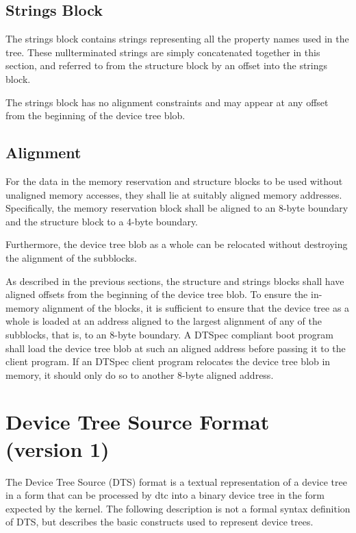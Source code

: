 \documentclass[a4paper,10pt,oneside]{sphinxmanual}
\begin{document}
\section{Strings Block}
\label{flattened-format:strings-block}\label{flattened-format:sect-fdt-strings-block}
The strings block contains strings representing all the property names
used in the tree. These nullterminated strings are simply concatenated
together in this section, and referred to from the structure block by an
offset into the strings block.

The strings block has no alignment constraints and may appear at any
offset from the beginning of the device tree blob.


\section{Alignment}
\label{flattened-format:alignment}\label{flattened-format:sect-fdt-alignment}
For the data in the memory reservation and structure blocks to be used
without unaligned memory accesses, they shall lie at suitably aligned
memory addresses. Specifically, the memory reservation block shall be
aligned to an 8-byte boundary and the structure block to a 4-byte
boundary.

Furthermore, the device tree blob as a whole can be relocated without
destroying the alignment of the subblocks.

As described in the previous sections, the structure and strings blocks
shall have aligned offsets from the beginning of the device tree blob.
To ensure the in-memory alignment of the blocks, it is sufficient to
ensure that the device tree as a whole is loaded at an address aligned
to the largest alignment of any of the subblocks, that is, to an 8-byte
boundary. A DTSpec compliant boot
program shall load the device tree blob at such an aligned address
before passing it to the client program. If an DTSpec client program
relocates the device tree blob in memory, it should only do so to
another 8-byte aligned address.


\chapter{Device Tree Source Format (version 1)}
\label{source-language:chapter-devicetree-source-format}\label{source-language:device-tree-source-format-version-1}\label{source-language::doc}
The Device Tree Source (DTS) format is a textual representation of a
device tree in a form that can be processed by dtc into a binary device
tree in the form expected by the kernel. The following description is
not a formal syntax definition of DTS, but describes the basic
constructs used to represent device trees.
\end{document}
